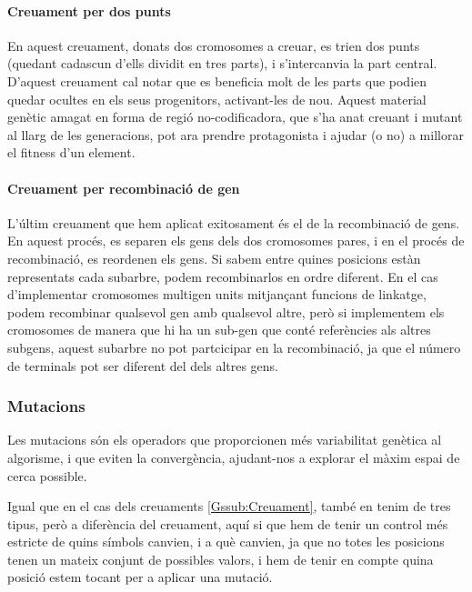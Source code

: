 \paragraph{Creuament per dos punts} %
\label{par:Creuament per dos punts}
En aquest creuament, donats dos cromosomes a creuar, es trien dos punts (quedant
cadascun d'ells dividit en tres parts), i s'intercanvia la part central.
D'aquest creuament cal notar que es beneficia molt de les parts que podien
quedar ocultes en els seus progenitors, activant-les de nou.  Aquest material
genètic amagat en forma de regió no-codificadora, que s'ha anat creuant i mutant
al llarg de les generacions, pot ara prendre protagonista i ajudar (o no) a
millorar el fitness d'un element.
\paragraph{Creuament per recombinació de gen} %
\label{par:Creuament per recombinacio de gen}

L'últim creuament que hem aplicat exitosament és el de la recombinació de gens.
En aquest procés, es separen els gens dels dos cromosomes pares, i en el procés
de recombinació, es reordenen els gens.  Si sabem entre quines posicions estàn 
representats cada subarbre, podem recombinarlos en ordre diferent. En el cas
d'implementar cromosomes multigen units mitjançant funcions de linkatge, podem 
recombinar qualsevol gen amb qualsevol altre, però si implementem els cromosomes
de manera que hi ha un sub-gen que conté referències als altres subgens, aquest 
subarbre no pot partcicipar en la recombinació, ja que el número de terminals pot
ser diferent del dels altres gens.



\subsubsection{Mutacions} %
\label{Gssub:Mutacions}

Les mutacions són els operadors que proporcionen més variabilitat genètica al
algorisme, i que eviten la convergència, ajudant-nos a explorar el màxim espai
de cerca possible.

Igual que en el cas dels creuaments \ref{Gssub:Creuament}, també en tenim de
tres tipus, però a diferència del creuament, aquí si que hem de tenir un control
més estricte de quins símbols canvien, i a què canvien, ja que no totes les
posicions tenen un mateix conjunt de possibles valors, i hem de tenir en compte
quina posició estem tocant per a aplicar una mutació.

